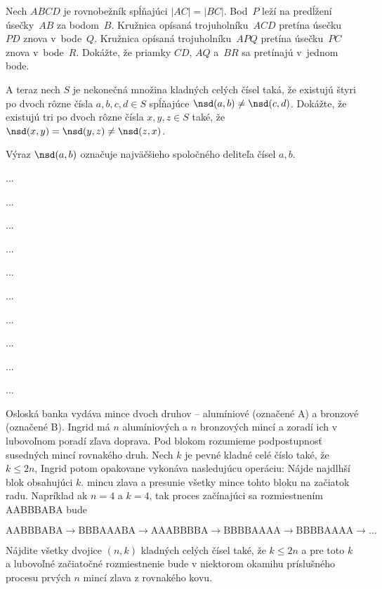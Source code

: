 {%

Nech $ABCD$ je rovnobežník spĺňajúci $|AC|=|BC|$. Bod~$P$ leží na predĺžení úsečky~$AB$ za bodom~$B$. Kružnica opísaná trojuholníku~$ACD$ pretína úsečku~$PD$ znova v~bode~$Q$. Kružnica opísaná trojuholníku~$APQ$ pretína úsečku~$PC$ znova v~bode~$R$. Dokážte, že priamky $CD$, $AQ$ a~$BR$ sa pretínajú v~jednom bode.}

{%

A teraz nech $S$ je nekonečná množina kladných celých čísel taká, že existujú štyri po dvoch rôzne čísla $a,b,c,d\in S$ spĺňajúce $\nsd(a,b)\ne \nsd(c,d)$. Dokážte, že existujú tri po dvoch rôzne čísla $x,y,z\in S$ také, že $\nsd(x,y)=\nsd(y,z)\ne \nsd(z,x)$.

\poznamka
Výraz $\nsd(a,b)$ označuje najväčšieho spoločného deliteľa čísel $a,b$.
}

{%
...}

{%
...}

{%
...}

{%
...}

{%
...}

{%
...}

{%
...}

{%
...}

{%
...}

{%
...}

{%
Osloská banka vydáva mince dvoch druhov -- alumíniové (označené A) a bronzové (označené B). Ingrid má $n$ alumíniových a $n$ bronzových mincí a zoradí ich v lubovoľnom poradí zľava doprava. Pod blokom rozumieme podpostupnosť susedných mincí rovnakého druh. Nech $k$ je pevné kladné celé číslo také, že $k \leq 2 n$, Ingrid potom opakovane vykonáva nasledujúcu operáciu: Nájde najdlhší blok obsahujúci $k$. mincu zlava a presunie všetky mince tohto bloku na začiatok radu. Napríklad ak $n=4$ a $k=4$, tak proces začínajúci sa rozmiestnením AABBBABA bude

$$
\text{AABBBABA} \rightarrow \text{BBBAAABA} \rightarrow \text{AAABBBBA} \rightarrow \text{BBBBAAAA} \rightarrow \text{BBBBAAAA} \rightarrow \ldots
$$

Nájdite všetky dvojice $(n, k)$ kladných celých čísel také, že $k \leq 2 n$ a pre toto $k$ a lubovoľné začiatočné rozmiestnenie bude v niektorom okamihu príslušného procesu prvých $n$ mincí zlava z rovnakého kovu.
}

